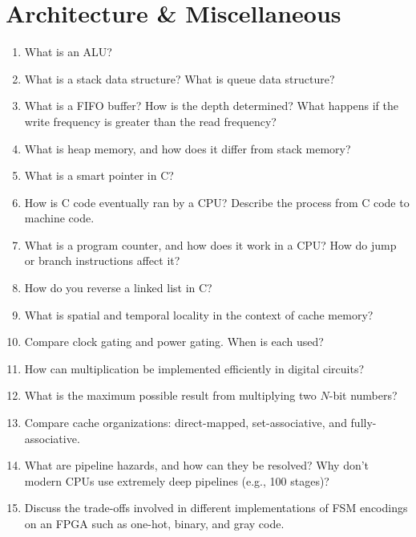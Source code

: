 \documentclass[11pt]{article}
\begin{document}
\section{Architecture \& Miscellaneous}
\begin{enumerate}
    \item What is an ALU?

    \item What is a stack data structure? What is queue data structure?

    \item What is a FIFO buffer? How is the depth determined? What happens if
    the write frequency is greater than the read frequency?

    \item What is heap memory, and how does it differ from stack memory?

    \item What is a smart pointer in C?

    \item How is C code eventually ran by a CPU? Describe the process from C code to machine code.

    \item What is a program counter, and how does it work in a CPU? How do jump or branch instructions affect it?

    \item How do you reverse a linked list in C?

    \item What is spatial and temporal locality in the context of cache memory?

    \item Compare clock gating and power gating. When is each used?

    \item How can multiplication be implemented efficiently in digital
    circuits?

    \item What is the maximum possible result from multiplying two \(N\)-bit
    numbers?

    \item Compare cache organizations: direct-mapped, set-associative, and
    fully-associative.

    \item What are pipeline hazards, and how can they be resolved? Why don't
    modern CPUs use extremely deep pipelines (e.g., 100 stages)?

    \item Discuss the trade-offs involved in different implementations of FSM encodings on an FPGA such as
    one-hot, binary, and gray code.


\end{enumerate}
\end{document}
